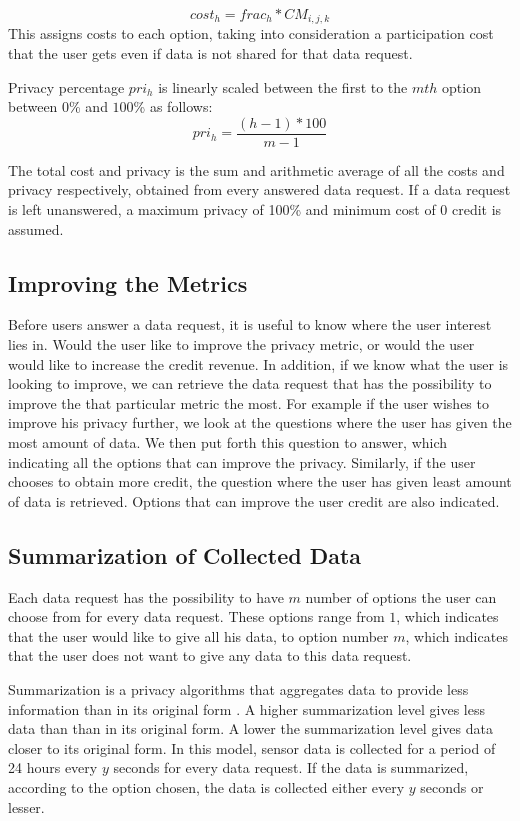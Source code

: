 \begin{equation}
cost_{h} = frac_{h} * CM_{i,j,k}
\end{equation}
This assigns costs to each option, taking into consideration a participation cost that the user gets even if data is not shared for that data request.

Privacy percentage $pri_{h}$ is linearly scaled between the first to the $mth$ option between $0$\% and $100$\% as follows:
\begin{equation}
pri_{h} = \frac{(h-1) * 100}{m-1}
\end{equation}

The total cost and privacy is the sum and arithmetic average of all the costs and privacy respectively, obtained from every answered data request. If a data request is left unanswered, a maximum privacy of 100\% and minimum cost of 0 credit is assumed.


\subsection{Improving the Metrics}
Before users answer a data request, it is useful to know where the user interest lies in. Would the user like to improve
the privacy metric, or would the user would like to increase the credit revenue. In addition, if we know what the user is looking to improve, we can retrieve the data request that has the possibility to improve the that particular metric the most.
For example if the user wishes to improve his privacy further, we look at the questions where the user has given the most amount of data. We then put forth this question to answer, which indicating all the options that can improve the privacy. Similarly, if the user chooses to obtain more credit, the question where the user has given least amount of data is retrieved. Options that can improve the user credit are also indicated.


\subsection{Summarization of Collected Data} \label{summa}
Each data request has the possibility to have $m$ number of options the user can choose from for every data request. These options range from $1$, which indicates that the user would like to give all his data, to option number $m$, which indicates that the user does not want to give any data to this data request.

Summarization is a privacy algorithms that aggregates data to provide less information than in its original form \cite{pournaras2016self}. A higher summarization level gives less data than than in its original form. A lower the summarization level gives data closer to its original form. In this model, sensor data is collected for a period of 24 hours every $y$ seconds for every data request. If the data is summarized, according to the option chosen, the data is collected either every $y$ seconds or lesser.

